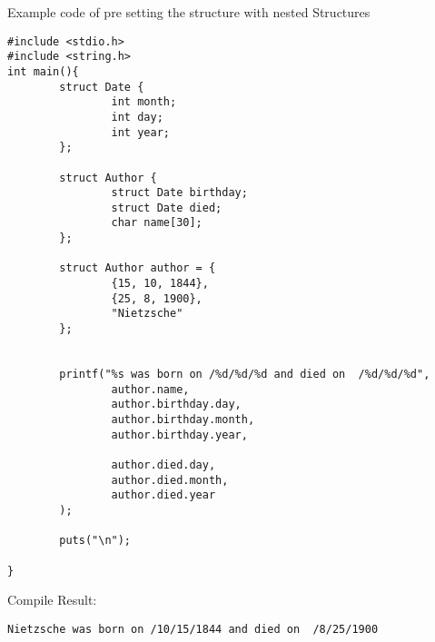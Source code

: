 \break
Example code of pre setting the structure with nested Structures
\begin{lstlisting}
#include <stdio.h>
#include <string.h>
int main(){
        struct Date {
                int month;
                int day;
                int year;
        };
       
        struct Author {
                struct Date birthday;
                struct Date died;
                char name[30];
        };
       
        struct Author author = {
                {15, 10, 1844},
                {25, 8, 1900},
                "Nietzsche"
        };
       
       
        printf("%s was born on /%d/%d/%d and died on  /%d/%d/%d",
                author.name,
                author.birthday.day,
                author.birthday.month,
                author.birthday.year,
       
                author.died.day,
                author.died.month,
                author.died.year
        );

        puts("\n");
       
}

\end{lstlisting}
Compile Result:
\begin{lstlisting}
Nietzsche was born on /10/15/1844 and died on  /8/25/1900
\end{lstlisting}

